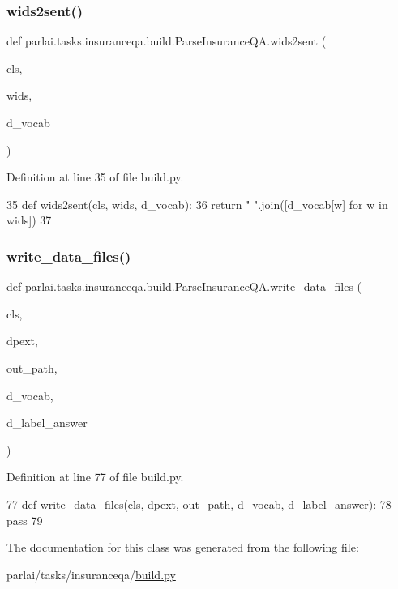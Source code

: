 \subsubsection{\texorpdfstring{wids2sent()}{wids2sent()}}
{\footnotesize\ttfamily def parlai.\+tasks.\+insuranceqa.\+build.\+Parse\+Insurance\+Q\+A.\+wids2sent (\begin{DoxyParamCaption}\item[{}]{cls,  }\item[{}]{wids,  }\item[{}]{d\+\_\+vocab }\end{DoxyParamCaption})}



Definition at line 35 of file build.\+py.


\begin{DoxyCode}
35     \textcolor{keyword}{def }wids2sent(cls, wids, d\_vocab):
36         \textcolor{keywordflow}{return} \textcolor{stringliteral}{" "}.join([d\_vocab[w] \textcolor{keywordflow}{for} w \textcolor{keywordflow}{in} wids])
37 
\end{DoxyCode}
\mbox{\label{classparlai_1_1tasks_1_1insuranceqa_1_1build_1_1ParseInsuranceQA_abd3ae5efba9775554d68e911fd36c840}} 
\subsubsection{\texorpdfstring{write\+\_\+data\+\_\+files()}{write\_data\_files()}}
{\footnotesize\ttfamily def parlai.\+tasks.\+insuranceqa.\+build.\+Parse\+Insurance\+Q\+A.\+write\+\_\+data\+\_\+files (\begin{DoxyParamCaption}\item[{}]{cls,  }\item[{}]{dpext,  }\item[{}]{out\+\_\+path,  }\item[{}]{d\+\_\+vocab,  }\item[{}]{d\+\_\+label\+\_\+answer }\end{DoxyParamCaption})}



Definition at line 77 of file build.\+py.


\begin{DoxyCode}
77     \textcolor{keyword}{def }write\_data\_files(cls, dpext, out\_path, d\_vocab, d\_label\_answer):
78         \textcolor{keywordflow}{pass}
79 
\end{DoxyCode}


The documentation for this class was generated from the following file\+:\begin{DoxyCompactItemize}
\item 
parlai/tasks/insuranceqa/\hyperlink{parlai_2tasks_2insuranceqa_2build_8py}{build.\+py}\end{DoxyCompactItemize}
